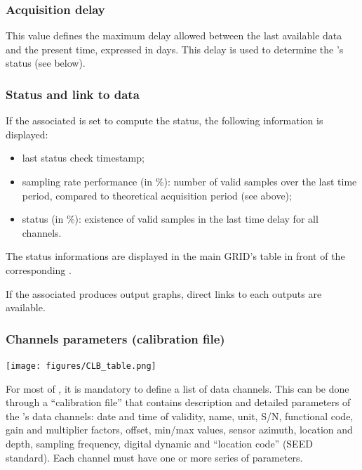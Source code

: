 \subsubsection{Acquisition delay}

This value defines the maximum delay allowed between the last available data and the present time, expressed in days. This delay is used to determine the 's status (see below).

\subsubsection{Status and link to data}

If the associated  is set to compute the  status, the following information is displayed:
\begin{itemize}
\item last status check timestamp;
\item sampling rate performance (in \%): number of valid samples over the last time period, compared to theoretical acquisition period (see above);
\item status (in \%): existence of valid samples in the last time delay for all channels.
\end{itemize}

The status informations are displayed in the main GRID's table in front of the corresponding .

If the associated  produces output graphs, direct links to each outputs are available.


\subsubsection{Channels parameters (calibration file)}
\label{clb}

\texttt{[image: figures/CLB\_table.png]}

For most of , it is mandatory to define a list of data channels. This can be done through a ``calibration file'' that contains description and detailed parameters of the 's data channels: date and time of validity, name, unit, S/N, functional code, gain and multiplier factors, offset, min/max values, sensor azimuth, location and depth, sampling frequency, digital dynamic and ``location code'' (SEED standard). Each channel must have one or more series of parameters. 

